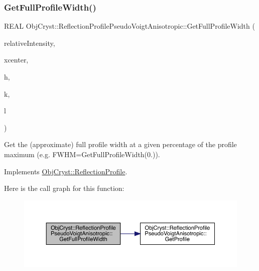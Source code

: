 \subsubsection{\texorpdfstring{GetFullProfileWidth()}{GetFullProfileWidth()}}
{\footnotesize\ttfamily R\+E\+AL Obj\+Cryst\+::\+Reflection\+Profile\+Pseudo\+Voigt\+Anisotropic\+::\+Get\+Full\+Profile\+Width (\begin{DoxyParamCaption}\item[{const R\+E\+AL}]{relative\+Intensity,  }\item[{const R\+E\+AL}]{xcenter,  }\item[{const R\+E\+AL}]{h,  }\item[{const R\+E\+AL}]{k,  }\item[{const R\+E\+AL}]{l }\end{DoxyParamCaption})\hspace{0.3cm}{\ttfamily [virtual]}}

Get the (approximate) full profile width at a given percentage of the profile maximum (e.\+g. F\+W\+HM=Get\+Full\+Profile\+Width(0.)). 

Implements \mbox{\hyperlink{class_obj_cryst_1_1_reflection_profile_ac6d2a69e63c3efd06f30ab134062bbc0}{Obj\+Cryst\+::\+Reflection\+Profile}}.

Here is the call graph for this function\+:
\nopagebreak
\begin{figure}[H]
\begin{center}
\leavevmode
\includegraphics[width=350pt]{class_obj_cryst_1_1_reflection_profile_pseudo_voigt_anisotropic_a43a9c77aa312df5ca00969c7f866f7a4_cgraph}
\end{center}
\end{figure}
\mbox{\label{class_obj_cryst_1_1_reflection_profile_pseudo_voigt_anisotropic_a84ef718166e001fc1cada3320550674e}} 
